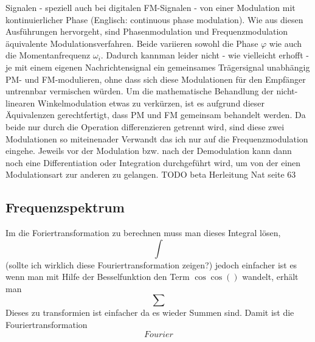 Signalen - speziell auch bei digitalen FM-Signalen - von einer Modulation mit kontinuierlicher Phase (Englisch: continuous phase modulation).
Wie aus diesen Ausführungen hervorgeht, sind Phasenmodulation und Frequenzmodulation äquivalente Modulationsverfahren.
Beide variieren sowohl die Phase \(\varphi\) wie auch die Momentanfrequenz \(\omega_i.\)
Dadurch kannman leider nicht - wie vielleicht erhofft - je mit einem eigenen Nachrichtensignal ein gemeinsames Trägersignal unabhängig PM- und FM-modulieren,
 ohne dass sich diese Modulationen für den Empfänger untrennbar vermischen würden.
Um die mathematische Behandlung der nicht-linearen Winkelmodulation etwas zu verkürzen, ist es aufgrund dieser Äquivalenzen gerechtfertigt,
dass PM und FM gemeinsam behandelt werden. 
Da beide nur durch die Operation differenzieren getrennt wird, sind diese zwei Modulationen so miteinenader Verwandt das ich nur auf die Frequenzmodulation eingehe.
Jeweils vor der Modulation bzw. nach der Demodulation kann dann noch eine Differentiation oder 
Integration durchgeführt wird, um von der einen Modulationsart zur anderen zu gelangen.
\citeauthor{fm:NAT}
TODO beta Herleitung Nat seite 63

\subsection{Frequenzspektrum}

Im die Foriertransformation zu berechnen muss man dieses Integral lösen,
\[
    \int
\]
(sollte ich wirklich diese Fouriertransformation zeigen?)
jedoch einfacher ist es wenn man mit Hilfe der Besselfunktion den Term \( \cos \cos()\) wandelt,  erhält man
\[
    \sum
\]
Dieses zu transformien ist einfacher da es wieder Summen sind.
Damit ist die Fouriertransformation
\[
    Fourier
    \label{fm:FM:fourie}
\]

